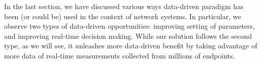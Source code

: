 In the last section, we have discussed various ways
data-driven paradigm has been (or could be) used 
in the context of network systems. In particular, we observe
two types of data-driven opportunities: improving setting
of parameters, and improving real-time decision making.
While our solution follows the second type, as we will
see, it unleashes more data-driven benefit by 
taking advantage of more data of real-time measurements 
collected from millions of endpoints.





